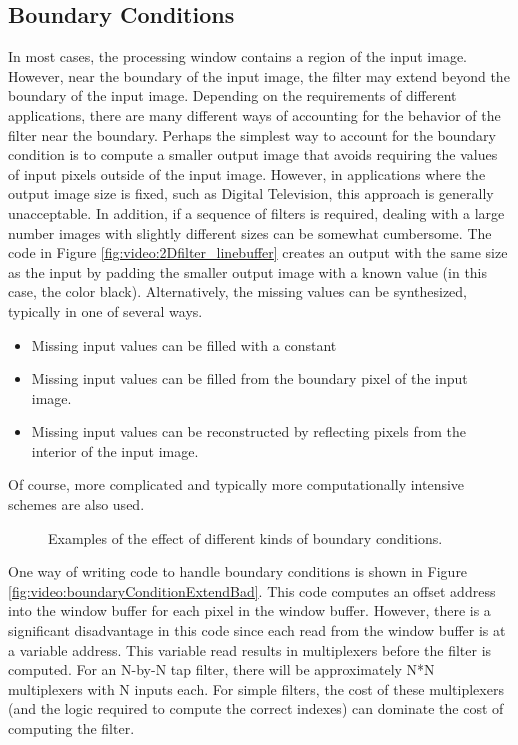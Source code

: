 \subsection{Boundary Conditions}

In most cases, the processing window contains a region of the input image.  However, near the boundary of the input image, the filter may extend beyond the boundary of the input image.  Depending on the requirements of different applications, there are many different ways of accounting for the behavior of the filter near the boundary.  Perhaps the simplest way to account for the boundary condition is to compute a smaller output image that avoids requiring the values of input pixels outside of the input image.  However, in applications where the output image size is fixed, such as Digital Television, this approach is generally unacceptable.  In addition, if a sequence of filters is required, dealing with a large number images with slightly different sizes can be somewhat cumbersome.  The code in Figure \ref{fig:video:2Dfilter_linebuffer} creates an output with the same size as the input by padding the smaller output image with a known value (in this case, the color black).   Alternatively, the missing values can be synthesized, typically in one of several ways.
\begin{itemize}
\item Missing input values can be filled with a constant
\item Missing input values can be filled from the boundary pixel of the input image.
\item Missing input values can be reconstructed by reflecting pixels from the interior of the input image.
\end{itemize}
Of course, more complicated and typically more computationally intensive schemes are also used.

\begin{figure}
\centering
{\tiny }
\caption{Examples of the effect of different kinds of boundary conditions.}\label{fig:video:boundary_conditions}
\end{figure}

One way of writing code to handle boundary conditions is shown in Figure \ref{fig:video:boundaryConditionExtendBad}.  This code computes an offset address into the window buffer for each pixel in the window buffer.  However, there is a significant disadvantage in this code since each read from the window buffer is at a variable address.  This variable read results in multiplexers before the filter is computed.  For an N-by-N tap filter, there will be approximately N*N multiplexers with N inputs each.  For simple filters, the cost of these multiplexers (and the logic required to compute the correct indexes) can dominate the cost of computing the filter.


